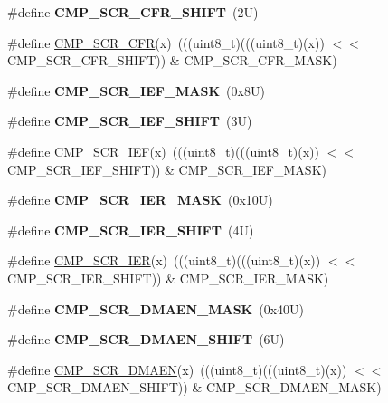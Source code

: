 \begin{DoxyCompactItemize}
\#define {\bfseries C\+M\+P\+\_\+\+S\+C\+R\+\_\+\+C\+F\+R\+\_\+\+S\+H\+I\+FT}~(2\+U)
\item 
\#define \mbox{\hyperlink{group___c_m_p___register___masks_gae9adf37fae856f25e1caf7b4a48a7912}{C\+M\+P\+\_\+\+S\+C\+R\+\_\+\+C\+FR}}(x)~(((uint8\+\_\+t)(((uint8\+\_\+t)(x)) $<$$<$ C\+M\+P\+\_\+\+S\+C\+R\+\_\+\+C\+F\+R\+\_\+\+S\+H\+I\+FT)) \& C\+M\+P\+\_\+\+S\+C\+R\+\_\+\+C\+F\+R\+\_\+\+M\+A\+SK)
\item 
\mbox{\label{group___c_m_p___register___masks_gab36859944bb484db243358bb9a1a9692}} 
\#define {\bfseries C\+M\+P\+\_\+\+S\+C\+R\+\_\+\+I\+E\+F\+\_\+\+M\+A\+SK}~(0x8\+U)
\item 
\mbox{\label{group___c_m_p___register___masks_gaa9d242eac081d0d572e120ea3afa0e6f}} 
\#define {\bfseries C\+M\+P\+\_\+\+S\+C\+R\+\_\+\+I\+E\+F\+\_\+\+S\+H\+I\+FT}~(3\+U)
\item 
\#define \mbox{\hyperlink{group___c_m_p___register___masks_ga4cedf2626e72a16419c72b4bc802063e}{C\+M\+P\+\_\+\+S\+C\+R\+\_\+\+I\+EF}}(x)~(((uint8\+\_\+t)(((uint8\+\_\+t)(x)) $<$$<$ C\+M\+P\+\_\+\+S\+C\+R\+\_\+\+I\+E\+F\+\_\+\+S\+H\+I\+FT)) \& C\+M\+P\+\_\+\+S\+C\+R\+\_\+\+I\+E\+F\+\_\+\+M\+A\+SK)
\item 
\mbox{\label{group___c_m_p___register___masks_ga2fbc99fb91c41e37b82ecabda7a9f0c7}} 
\#define {\bfseries C\+M\+P\+\_\+\+S\+C\+R\+\_\+\+I\+E\+R\+\_\+\+M\+A\+SK}~(0x10\+U)
\item 
\mbox{\label{group___c_m_p___register___masks_ga24fc92779af70d4d7fc87102c53b86ca}} 
\#define {\bfseries C\+M\+P\+\_\+\+S\+C\+R\+\_\+\+I\+E\+R\+\_\+\+S\+H\+I\+FT}~(4\+U)
\item 
\#define \mbox{\hyperlink{group___c_m_p___register___masks_ga663074e77d49fc2f2a715957bbcb76c1}{C\+M\+P\+\_\+\+S\+C\+R\+\_\+\+I\+ER}}(x)~(((uint8\+\_\+t)(((uint8\+\_\+t)(x)) $<$$<$ C\+M\+P\+\_\+\+S\+C\+R\+\_\+\+I\+E\+R\+\_\+\+S\+H\+I\+FT)) \& C\+M\+P\+\_\+\+S\+C\+R\+\_\+\+I\+E\+R\+\_\+\+M\+A\+SK)
\item 
\mbox{\label{group___c_m_p___register___masks_ga217e649d3512ff1bba2c22885d768148}} 
\#define {\bfseries C\+M\+P\+\_\+\+S\+C\+R\+\_\+\+D\+M\+A\+E\+N\+\_\+\+M\+A\+SK}~(0x40\+U)
\item 
\mbox{\label{group___c_m_p___register___masks_gafafda406631ad26c72187f4df02df484}} 
\#define {\bfseries C\+M\+P\+\_\+\+S\+C\+R\+\_\+\+D\+M\+A\+E\+N\+\_\+\+S\+H\+I\+FT}~(6\+U)
\item 
\#define \mbox{\hyperlink{group___c_m_p___register___masks_ga37fb4febf635332c87cd88361b4f8875}{C\+M\+P\+\_\+\+S\+C\+R\+\_\+\+D\+M\+A\+EN}}(x)~(((uint8\+\_\+t)(((uint8\+\_\+t)(x)) $<$$<$ C\+M\+P\+\_\+\+S\+C\+R\+\_\+\+D\+M\+A\+E\+N\+\_\+\+S\+H\+I\+FT)) \& C\+M\+P\+\_\+\+S\+C\+R\+\_\+\+D\+M\+A\+E\+N\+\_\+\+M\+A\+SK)
\end{DoxyCompactItemize}
